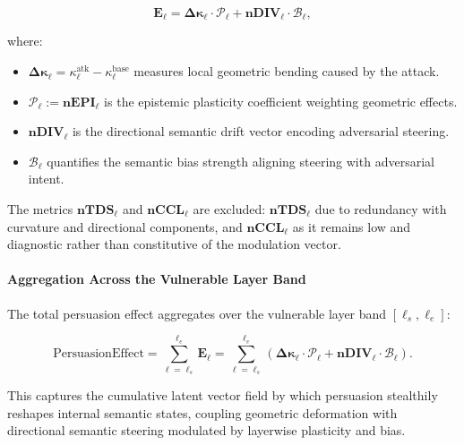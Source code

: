\[
\mathbf{E}_\ell = \boldsymbol{\Delta \kappa_\ell} \cdot \boldsymbol{\mathcal{P}_\ell} + \mathbf{nDIV_\ell} \cdot \boldsymbol{\mathcal{B}_\ell},
\]

where:

\begin{itemize}[itemsep=0em, leftmargin=1em]
    \item \(\boldsymbol{\Delta \kappa_\ell} = \kappa_\ell^{\text{atk}} - \kappa_\ell^{\text{base}}\) measures local geometric bending caused by the attack.

    \item \(\boldsymbol{\mathcal{P}_\ell} := \mathbf{nEPI_\ell}\) is the epistemic plasticity coefficient weighting geometric effects.

    \item \(\mathbf{nDIV_\ell}\) is the directional semantic drift vector encoding adversarial steering.

    \item \(\boldsymbol{\mathcal{B}_\ell}\) quantifies the semantic bias strength aligning steering with adversarial intent.
\end{itemize}

The metrics \(\mathbf{nTDS_\ell}\) and \(\mathbf{nCCL_\ell}\) are excluded: \(\mathbf{nTDS_\ell}\) due to redundancy with curvature and directional components, and \(\mathbf{nCCL_\ell}\) as it remains low and diagnostic rather than constitutive of the modulation vector.

\vspace{0.5em}
\paragraph{\textbf{Aggregation Across the Vulnerable Layer Band}}

The total persuasion effect aggregates over the vulnerable layer band \([\ell_s, \ell_e]\):

\[
\boxed{
\text{PersuasionEffect} = \sum_{\ell = \ell_s}^{\ell_e} \mathbf{E}_\ell = \sum_{\ell = \ell_s}^{\ell_e} \left( \boldsymbol{\Delta \kappa_\ell} \cdot \boldsymbol{\mathcal{P}_\ell} + \mathbf{nDIV_\ell} \cdot \boldsymbol{\mathcal{B}_\ell} \right).
}
\]

This captures the cumulative latent vector field by which persuasion stealthily reshapes internal semantic states, coupling geometric deformation with directional semantic steering modulated by layerwise plasticity and bias.

\vspace{0.5em}
